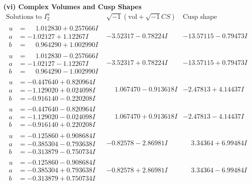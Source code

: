 \documentclass[1p]{elsarticle_modified}
\theoremstyle{definition}
\newcommand{\I}{\sqrt{-1}}
\begin{document}
\newpage\flushleft \textbf{(vi) Complex Volumes and Cusp Shapes}
$$\begin{array}{c|c|c}  
\text{Solutions to }I^u_{2}& \I (\text{vol} + \sqrt{-1}CS) & \text{Cusp shape}\\
 \hline 
\begin{aligned}
u &= \phantom{-}1.012830 + 0.257666 I \\
a &= -1.02127 + 1.12267 I \\
b &= \phantom{-}0.964290 + 1.002990 I\end{aligned}
 & -3.52317 - 0.78224 I & -13.57115 - 0.79473 I \\ \hline\begin{aligned}
u &= \phantom{-}1.012830 - 0.257666 I \\
a &= -1.02127 - 1.12267 I \\
b &= \phantom{-}0.964290 - 1.002990 I\end{aligned}
 & -3.52317 + 0.78224 I & -13.57115 + 0.79473 I \\ \hline\begin{aligned}
u &= -0.447640 + 0.820964 I \\
a &= -1.129020 + 0.024098 I \\
b &= -0.916140 - 0.220208 I\end{aligned}
 & \phantom{-}1.067470 - 0.913618 I & -2.47813 + 4.14437 I \\ \hline\begin{aligned}
u &= -0.447640 - 0.820964 I \\
a &= -1.129020 - 0.024098 I \\
b &= -0.916140 + 0.220208 I\end{aligned}
 & \phantom{-}1.067470 + 0.913618 I & -2.47813 - 4.14437 I \\ \hline\begin{aligned}
u &= -0.125860 + 0.908684 I \\
a &= -0.385304 - 0.793638 I \\
b &= -0.313879 - 0.750734 I\end{aligned}
 & -0.82578 - 2.86981 I & \phantom{-}3.34364 + 6.99484 I \\ \hline\begin{aligned}
u &= -0.125860 - 0.908684 I \\
a &= -0.385304 + 0.793638 I \\
b &= -0.313879 + 0.750734 I\end{aligned}
 & -0.82578 + 2.86981 I & \phantom{-}3.34364 - 6.99484 I \\ \hline\begin{aligned}

\end{aligned}
\end{array}$$
\end{document}
